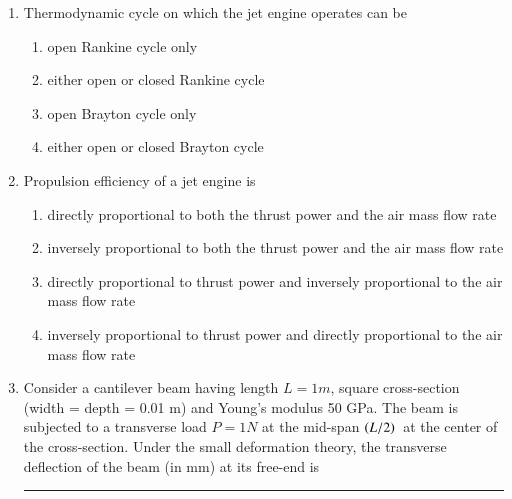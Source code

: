 \documentclass[journal]{IEEEtran}
\begin{document}
\begin{enumerate}[start=14]
\item Thermodynamic cycle on which the jet engine operates can be
 \begin{multicols}{2}
    \begin{enumerate}
        \item open Rankine cycle only
        \item either open or closed Rankine cycle
        \item open Brayton cycle only
        \item either open or closed Brayton cycle
    \end{enumerate}
\end{multicols}
\item Propulsion efficiency of a jet engine is
    \begin{enumerate}
        \item directly proportional to both the thrust power and the air mass flow rate
        \item inversely proportional to both the thrust power and the air mass flow rate
        \item directly proportional to thrust power and inversely proportional to the air mass flow rate
        \item inversely proportional to thrust power and directly proportional to the air mass flow rate
    \end{enumerate}


\item  Consider a cantilever beam having length $ L = 1m $, square cross-section\\ (width = depth = 0.01 m) and Young's modulus 50 GPa. The beam is subjected to a transverse load $ P = 1N $ at the mid-span $\left(L/2\right){}$ at the center of the cross-section. Under the small deformation theory, the transverse deflection of the beam (in mm) at its free-end is \rule{3cm}{0.15mm}

\begin{figure}[!ht]
\centering
{}%
\label{fig:my_label}
\end{figure}
\end{enumerate}
\end{document}
